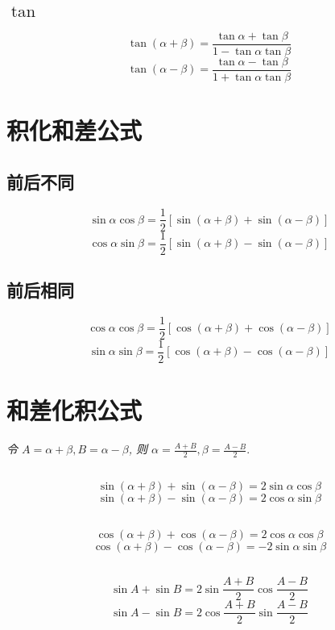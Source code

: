 \documentclass[a4paper, fleqn]{ctexart}
\begin{document}
\begin{multicols}{2}
	\subsection{$\tan$}
	\[ \tan\left( \alpha + \beta \right) = 
	\frac{\tan\alpha + \tan\beta}{1 - \tan\alpha\tan\beta}\]
	\[ \tan\left( \alpha - \beta \right) = 
	\frac{\tan\alpha - \tan\beta}{1 + \tan\alpha\tan\beta}\]

	\section{积化和差公式}
	\subsection{前后不同}
	\[\sin\alpha\cos\beta=\frac{1}{2}\left[
	\sin\left(\alpha+\beta\right)+
	\sin\left(\alpha-\beta\right)\right]\]
	\[\cos\alpha\sin\beta=\frac{1}{2}\left[
	\sin\left(\alpha+\beta\right)-
	\sin\left(\alpha-\beta\right)\right]\]
	\subsection{前后相同}
	\[\cos\alpha\cos\beta=\frac{1}{2}\left[
	\cos\left(\alpha+\beta\right)+
	\cos\left(\alpha-\beta\right)\right]\]
	\[\sin\alpha\sin\beta=\frac{1}{2}\left[
	\cos\left(\alpha+\beta\right)-
	\cos\left(\alpha-\beta\right)\right]\]
	
	
	\section{和差化积公式}
	\emph{令 $ A = \alpha + \beta, B = \alpha - \beta $, 
	则 $ \alpha = \frac{A+B}{2}, \beta = \frac{A-B}{2} $}.
	\subsection{}
	\[ \sin(\alpha + \beta) + \sin(\alpha - \beta) = 
	2 \sin\alpha\cos\beta \]
	\[ \sin(\alpha + \beta) - \sin(\alpha - \beta) = 
	2 \cos\alpha\sin\beta \]
	
	\subsection{}
	\[ \cos(\alpha + \beta) + \cos(\alpha - \beta) = 
	2 \cos\alpha\cos\beta \]
	\[ \cos(\alpha + \beta) - \cos(\alpha - \beta) = 
	-2 \sin\alpha\sin\beta \]
	
	\subsection{}
	\[ \sin A + \sin B 
	= 2 \sin \frac{A + B}{2} \cos \frac{A - B}{2} \]
	\[ \sin A - \sin B 
	= 2 \cos \frac{A + B}{2} \sin \frac{A - B}{2} \] 
	

\end{multicols}
\end{document}
